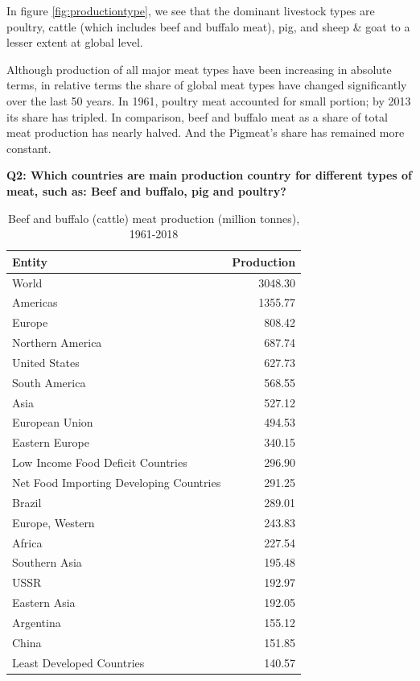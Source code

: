 \documentclass[11pt,a4paper,]{article}
\begin{document}
In figure \ref{fig:productiontype}, we see that the dominant livestock types are poultry, cattle (which includes beef and buffalo meat), pig, and sheep \& goat to a lesser extent at global level.

Although production of all major meat types have been increasing in absolute terms, in relative terms the share of global meat types have changed significantly over the last 50 years. In 1961, poultry meat accounted for small portion; by 2013 its share has tripled. In comparison, beef and buffalo meat as a share of total meat production has nearly halved. And the Pigmeat's share has remained more constant.

\clearpage

\textbf{Q2: Which countries are main production country for different types of meat, such as: Beef and buffalo, pig and poultry? }

\begin{table}

\caption{\label{tab:cattle}Beef and buffalo (cattle) meat production (million tonnes), 1961-2018}
\centering
\begin{tabular}[t]{lr}
\toprule
Entity & Production\\
\midrule
World & 3048.30\\
Americas & 1355.77\\
Europe & 808.42\\
Northern America & 687.74\\
United States & 627.73\\
\addlinespace
South America & 568.55\\
Asia & 527.12\\
European Union & 494.53\\
Eastern Europe & 340.15\\
Low Income Food Deficit Countries & 296.90\\
\addlinespace
Net Food Importing Developing Countries & 291.25\\
Brazil & 289.01\\
Europe, Western & 243.83\\
Africa & 227.54\\
Southern Asia & 195.48\\
\addlinespace
USSR & 192.97\\
Eastern Asia & 192.05\\
Argentina & 155.12\\
China & 151.85\\
Least Developed Countries & 140.57\\
\bottomrule
\end{tabular}
\end{table}
\end{document}
